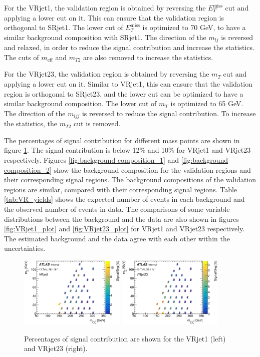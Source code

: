 For the VRjet1, the validation region is obtained by reversing the $E_T^{\text{miss}}$ cut and applying a lower cut on it.
This can ensure that the validation region is orthogonal to SRjet1.
The lower cut of $E_T^{\text{miss}}$ is optimized to 70 GeV, to have a similar background composition with SRjet1.
The direction of the $m_{lj}$ is reversed and relaxed, in order to reduce the signal contribution and increase the statistics.
The cuts of $m_{\text{eff}}$ and $m_{T2}$ are also removed to increase the statistics.

For the VRjet23, the validation region is obtained by reversing the $m_T$ cut and applying a lower cut on it.
Similar to VRjet1, this can ensure that the validation region is orthogonal to SRjet23, and the lower cut can be optimized to have a similar background composition.
The lower cut of $m_T$ is optimized to 65 GeV.
The direction of the $m_{ljj}$ is reversed to reduce the signal contribution.
To increase the statistics, the $m_{T2}$ cut is removed.

The percentages of signal contribution for different mass points are shown in figure \ref{fig:signal_contribution_VR}. The signal contribution is below 12\% and 10\% for VRjet1 and VRjet23 respectively.
Figures \ref{fig:background composition_1} and \ref{fig:background composition_2} show the background composition for the validation regions and their corresponding signal regions.
The background compositions of the validation regions are similar, compared with their corresponding signal regions.
Table \ref{tab:VR_yields} shows the expected number of events in each background and the observed number of events in data.
The comparisons of some variable distributions between the background and the data are also shown in figures \ref{fig:VRjet1_plot} and \ref{fig:VRjet23_plot} for VRjet1 and VRjet23 respectively.
The estimated background and the data agree with each other within the uncertainties.

\begin{figure}[htbp]
\centering
\includegraphics[width=0.45\textwidth]{data/plot/VR/SignalContamination_VRjet1.eps}
\includegraphics[width=0.45\textwidth]{data/plot/VR/SignalContamination_VRjet23.eps}
\caption{Percentages of signal contribution are shown for the VRjet1 (left) and VRjet23 (right).}
\label{fig:signal_contribution_VR}
\end{figure}

